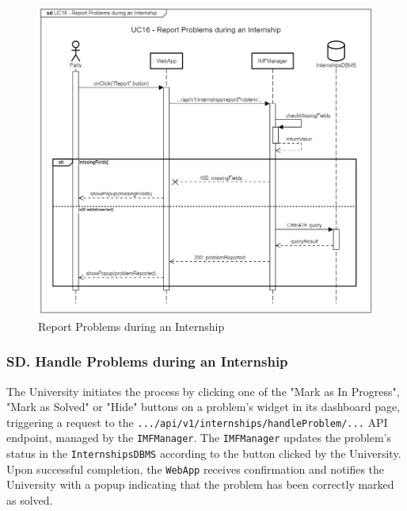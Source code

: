 \begin{figure}[H]
    \begin{center}
         \includegraphics[width=1\linewidth]{LaTeXCode/images/SequenceDiagrams/UC16-sequenceDiagram.png}
         \caption{Report Problems during an Internship}
         \label{fig:report_problems_sd}
     \end{center}
\end{figure}

\newpage

\subsubsection*{SD\cuc. Handle Problems during an Internship}
\label{subsubsec:handle_problems_sd}
The University initiates the process by clicking one of the "Mark as In Progress", "Mark as Solved" or "Hide" buttons on a problem's widget in its dashboard page, triggering a request to the \texttt{.../api/v1/internships/handleProblem/...} API endpoint, managed by the \texttt{IMFManager}. The \texttt{IMFManager} updates the problem's status in the \texttt{InternshipsDBMS} according to the button clicked by the University. Upon successful completion, the \texttt{WebApp} receives confirmation and notifies the University with a popup indicating that the problem has been correctly marked as solved.

